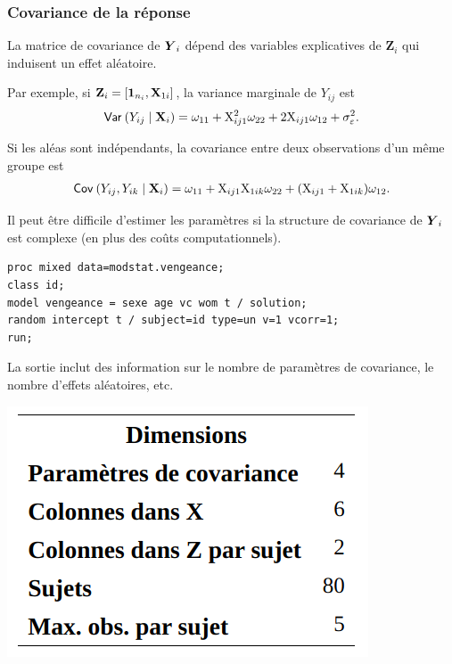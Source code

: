 \documentclass{beamer}
\begin{document}
\begin{frame}
\frametitle{Covariance de la réponse}
\bi
\item La matrice de covariance de $\boldsymbol {Y}_{i}$ dépend des variables explicatives de $\mathbf{Z}_i$ qui induisent un effet aléatoire.
\item Par exemple, si $\mathbf{Z}_{i} = [\boldsymbol {1}_{n_i}, \mathbf{X}_{1i}]$, la variance marginale de $Y_{ij}$ est
\begin{align*}
{\mathsf{Var}_{}}\left(Y_{ij}\mid \mathbf{X}_i\right)=\omega_{11}+\mathrm{X}_{ij1}^2 \omega_{22} + 2\mathrm{X}_{ij1} \omega_{12}+\sigma^2_{\varepsilon}.
\end{align*}
\item Si les aléas sont indépendants, la covariance entre deux observations d'un même groupe est 
\begin{align*}
{\mathsf{Cov}_{}}\left(Y_{ij}, Y_{ik}\mid \mathbf{X}_i\right)=\omega_{11}+\mathrm{X}_{ij1}\mathrm{X}_{1ik}\omega_{22}+(\mathrm{X}_{ij1}+\mathrm{X}_{1ik})\omega_{12}.
\end{align*}
\item Il peut être difficile d'estimer les paramètres si la structure de covariance de $\boldsymbol {Y}_i$ est complexe (en plus des coûts computationnels).
\ei
\end{frame}

\begin{frame}[fragile]
\begin{tcolorbox}[colback=white, colframe=hecblue, title=Code \SASlang{} pour ajuste un modèle avec pente aléatoire]
\begin{verbatim}
proc mixed data=modstat.vengeance;
class id;
model vengeance = sexe age vc wom t / solution;
random intercept t / subject=id type=un v=1 vcorr=1;
run;
\end{verbatim}
\end{tcolorbox}
La sortie inclut des information sur le nombre de paramètres de covariance, le nombre d'effets aléatoires, etc.
\begin{center}
\includegraphics[width = 0.35\linewidth]{img/c6/diapos7-e23}
\end{center}
\end{frame}
%  
\end{document}

